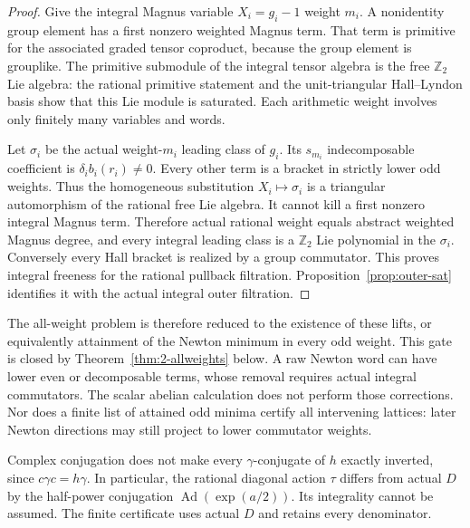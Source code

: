 \begin{proof}
Give the integral Magnus variable $X_i=g_i-1$ weight $m_i$.
A nonidentity group element has a first nonzero weighted Magnus
term. That term is primitive for the associated graded tensor
coproduct, because the group element is grouplike. The primitive
submodule of the integral tensor algebra is the free
$\mathbb Z_2$ Lie algebra: the rational primitive statement and
the unit-triangular Hall--Lyndon basis show that this Lie module
is saturated. Each arithmetic weight involves only finitely
many variables and words.

Let $\sigma_i$ be the actual weight-$m_i$ leading class of
$g_i$. Its $s_{m_i}$ indecomposable coefficient is
$\delta_i b_i(r_i)\ne0$. Every other term is a bracket in
strictly lower odd weights. Thus the homogeneous substitution
$X_i\mapsto\sigma_i$ is a triangular automorphism of the
rational free Lie algebra. It cannot kill a first nonzero
integral Magnus term. Therefore actual rational weight equals
abstract weighted Magnus degree, and every integral leading
class is a $\mathbb Z_2$ Lie polynomial in the $\sigma_i$.
Conversely every Hall bracket is realized by a group
commutator. This proves integral freeness for the rational
pullback filtration. Proposition~\ref{prop:outer-sat} identifies
it with the actual integral outer filtration.
\end{proof}

The all-weight problem is therefore reduced to the existence
of these lifts, or equivalently attainment of the Newton
minimum in every odd weight. This gate is closed by
Theorem~\ref{thm:2-allweights} below. A raw Newton word can have lower
even or decomposable terms, whose removal requires actual
integral commutators. The scalar abelian calculation does not
perform those corrections. Nor does a finite list of attained
odd minima certify all intervening lattices: later Newton
directions may still project to lower commutator weights.

Complex conjugation does not make every $\gamma$-conjugate of
$h$ exactly inverted, since $c\gamma c=h\gamma$. In particular,
the rational diagonal action $\tau$ differs from actual $D$ by
the half-power conjugation $\operatorname{Ad}(\exp(a/2))$.
Its integrality cannot be assumed. The finite certificate uses
actual $D$ and retains every denominator.
